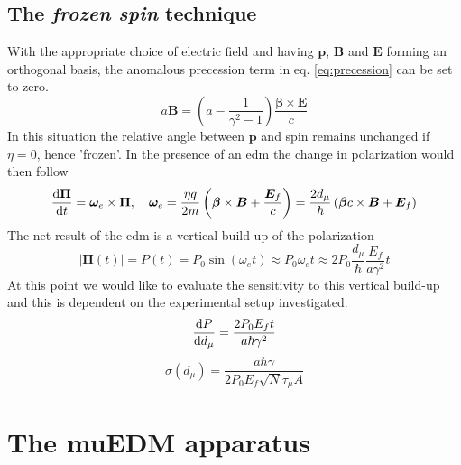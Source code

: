 \begin{refsection}
    \subsection{The \textit{frozen spin} technique}
        \cite{1,9} 
        With the appropriate choice of electric field and having $\bm{p}$, $\bm{B}$ and $\bm{E}$ forming an orthogonal basis, the anomalous precession term in eq. \ref{eq:precession} can be set to zero. 
        \begin{equation}
            a\bm{B}=\left( a-\frac{1}{\gamma^2-1} \right)\frac{\bm{\beta}\times\bm{E}}{c}
        \end{equation}
        In this situation the relative angle between $\bm{p}$ and spin remains unchanged if $\eta=0$, hence 'frozen'. 
        In the presence of an \gls{edm} the change in polarization would then follow
        \begin{equation}
            \label{eq:freezed}
            \dv{\bm{\Pi}}{t}=\bm{\omega}_e \times \bm{\Pi}, \quad
            \bm{\omega}_e=\frac{\eta q}{2m} \left(\bm{\beta}\times\bm{B}+\frac{\bm{E}_f}{c} \right) =
            \frac{2 d_\mu}{\hbar} \left(\bm{\beta}c\times\bm{B}+\bm{E}_f\right)
        \end{equation}
        The net result of the \gls{edm} is a vertical build-up of the polarization
        \begin{equation}
            |\bm{\Pi}(t)|=P(t)=P_0\sin(\omega_e t)\approx P_0 \omega_e t \approx 2P_0\frac{d_\mu}{\hbar}\frac{E_f}{a\gamma^2}t
        \end{equation}    
        At this point we would like to evaluate the sensitivity to this vertical build-up and this is dependent on the experimental setup investigated.
        \begin{equation}
            \dv{P}{d_\mu}=\frac{2P_0E_ft}{a\hbar\gamma^2}
        \end{equation}     
        \begin{equation}
           \sigma(d_\mu)=\frac{a\hbar\gamma}{2P_0E_f\sqrt{N}\tau_\mu A}
        \end{equation}                 

\section{The muEDM apparatus}

\end{refsection}
